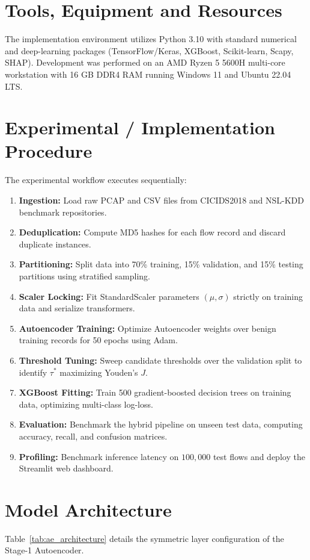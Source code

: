 \documentclass[12pt,a4paper]{report}
\begin{document}
\section{Tools, Equipment and Resources}
The implementation environment utilizes Python 3.10 with standard numerical and deep-learning packages (TensorFlow/Keras, XGBoost, Scikit-learn, Scapy, SHAP). Development was performed on an AMD Ryzen 5 5600H multi-core workstation with 16 GB DDR4 RAM running Windows 11 and Ubuntu 22.04 LTS.

\section{Experimental / Implementation Procedure}
The experimental workflow executes sequentially:
\begin{enumerate}
    \item \textbf{Ingestion:} Load raw PCAP and CSV files from CICIDS2018 and NSL-KDD benchmark repositories.
    \item \textbf{Deduplication:} Compute MD5 hashes for each flow record and discard duplicate instances.
    \item \textbf{Partitioning:} Split data into 70\% training, 15\% validation, and 15\% testing partitions using stratified sampling.
    \item \textbf{Scaler Locking:} Fit StandardScaler parameters $(\mu, \sigma)$ strictly on training data and serialize transformers.
    \item \textbf{Autoencoder Training:} Optimize Autoencoder weights over benign training records for 50 epochs using Adam.
    \item \textbf{Threshold Tuning:} Sweep candidate thresholds over the validation split to identify $\tau^*$ maximizing Youden's $J$.
    \item \textbf{XGBoost Fitting:} Train 500 gradient-boosted decision trees on training data, optimizing multi-class log-loss.
    \item \textbf{Evaluation:} Benchmark the hybrid pipeline on unseen test data, computing accuracy, recall, and confusion matrices.
    \item \textbf{Profiling:} Benchmark inference latency on $100{,}000$ test flows and deploy the Streamlit web dashboard.
\end{enumerate}

\section{Model Architecture}
Table~\ref{tab:ae_architecture} details the symmetric layer configuration of the Stage-1 Autoencoder.
\end{document}
